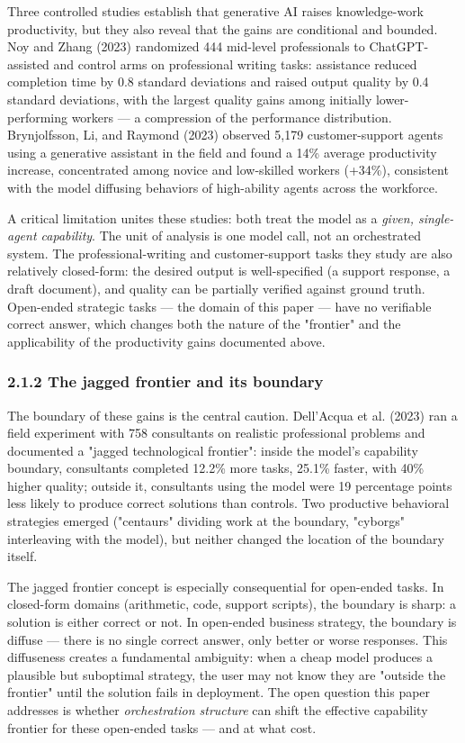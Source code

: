 \documentclass[11pt,a4paper]{article}
\begin{document}
Three controlled studies establish that generative AI raises knowledge-work
productivity, but they also reveal that the gains are conditional and
bounded. Noy and Zhang (2023) randomized 444 mid-level professionals to
ChatGPT-assisted and control arms on professional writing tasks: assistance
reduced completion time by 0.8 standard deviations and raised output quality
by 0.4 standard deviations, with the largest quality gains among initially
lower-performing workers — a compression of the performance distribution.
Brynjolfsson, Li, and Raymond (2023) observed 5,179 customer-support agents
using a generative assistant in the field and found a 14\% average
productivity increase, concentrated among novice and low-skilled workers
(+34\%), consistent with the model diffusing behaviors of high-ability agents
across the workforce.

A critical limitation unites these studies: both treat the model as a
\textit{given, single-agent capability}. The unit of analysis is one model call,
not an orchestrated system. The professional-writing and customer-support
tasks they study are also relatively closed-form: the desired output is
well-specified (a support response, a draft document), and quality can be
partially verified against ground truth. Open-ended strategic tasks — the
domain of this paper — have no verifiable correct answer, which changes both
the nature of the "frontier" and the applicability of the productivity
gains documented above.

\subsubsection{2.1.2 The jagged frontier and its boundary}

The boundary of these gains is the central caution. Dell'Acqua et al.
(2023) ran a field experiment with 758 consultants on realistic professional
problems and documented a "jagged technological frontier": inside the model's
capability boundary, consultants completed 12.2\% more tasks, 25.1\% faster,
with 40\% higher quality; outside it, consultants using the model were 19
percentage points less likely to produce correct solutions than controls.
Two productive behavioral strategies emerged ("centaurs" dividing work at
the boundary, "cyborgs" interleaving with the model), but neither changed
the location of the boundary itself.

The jagged frontier concept is especially consequential for open-ended tasks.
In closed-form domains (arithmetic, code, support scripts), the boundary is
sharp: a solution is either correct or not. In open-ended business strategy,
the boundary is diffuse — there is no single correct answer, only better or
worse responses. This diffuseness creates a fundamental ambiguity: when a
cheap model produces a plausible but suboptimal strategy, the user may not
know they are "outside the frontier" until the solution fails in deployment.
The open question this paper addresses is whether \textit{orchestration structure}
can shift the effective capability frontier for these open-ended tasks —
and at what cost.
\end{document}
